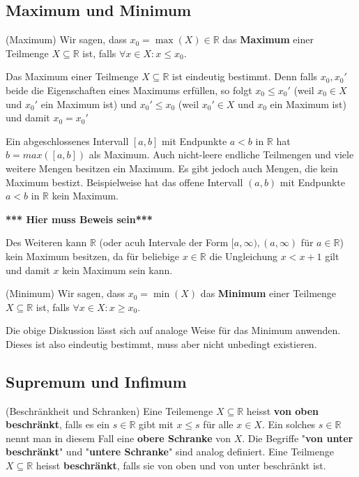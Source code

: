 \documentclass[../Analysis1_script.tex]{subfiles}
\begin{document}
 
\subsection{Maximum und Minimum}\label{mns:max_n_min}

\begin{definition}{(Maximum)}
	Wir sagen, dass $x_0 = \max(X) \in \mathbb{R}$ das \textbf{Maximum} einer Teilmenge $X \subseteq \mathbb{R}$ ist, falls $\forall x \in X: x \leq x_0$.
	
	Das Maximum einer Teilmenge $X \subseteq \mathbb{R}$ ist eindeutig bestimmt. Denn falls $x_0, x_0'$ beide die Eigenschaften eines Maximums erfüllen, so folgt $x_0 \leq x_0'$ (weil $x_0 \in X$ und $x_0'$ ein Maximum ist) und $x_0' \leq x_0$ (weil $x_0' \in X$ und $x_0$ ein Maximum ist) und damit $x_0 = x_0'$
	
	Ein abgeschlossenes Intervall $[a, b]$ mit Endpunkte $a < b$ in $\mathbb{R}$ hat $b = max([a, b])$ als Maximum. Auch nicht-leere endliche Teilmengen und viele weitere Mengen besitzen ein Maximum. Es gibt jedoch auch Mengen, die kein Maximum bestizt. Beispielweise hat das offene Intervall $(a, b)$ mit Endpunkte $a < b$ in $\mathbb{R}$ kein Maximum.
	
	\textbf{*** Hier muss Beweis sein***}
	
	Des Weiteren kann $\mathbb{R}$ (oder acuh  Intervale der Form $[a, \infty), (a, \infty)$ für $a \in \mathbb{R}$) kein Maximum besitzen, da für beliebige $x \in \mathbb{R}$ die Ungleichung $x < x + 1$ gilt und damit $x$ kein Maximum sein kann. 
\end{definition}

\begin{definition}{(Minimum)}
	Wir sagen, dass $x_0 = \min(X)$ das \textbf{Minimum} einer Teilmenge $X \subseteq \mathbb{R}$ ist, falls $\forall x \in X: x \geq x_0$.
	
	Die obige Diskussion lässt sich auf analoge Weise für das Minimum anwenden. Dieses ist also eindeutig bestimmt, muss aber nicht unbedingt existieren.
\end{definition}


\subsection{Supremum und Infimum}\label{mns:sup_n_inf}

\begin{definition}{(Beschränkheit und Schranken)}
	Eine Teilemenge $X \subseteq \mathbb{R}$ heisst \textbf{von oben beschränkt}, falls es ein $s \in \mathbb{R}$ gibt mit $x \leq s$ für alle $x \in X$. Ein solches $s \in \mathbb{R}$ nennt man in diesem Fall eine \textbf{obere Schranke} von $X$. Die Begriffe "\textbf{von unter beschränkt}" und "\textbf{untere Schranke}" sind analog definiert. Eine Teilmenge $X \subseteq \mathbb{R}$ heisst \textbf{beschränkt}, falls sie von oben und von unter beschränkt ist.
\end{definition}
\end{document}
